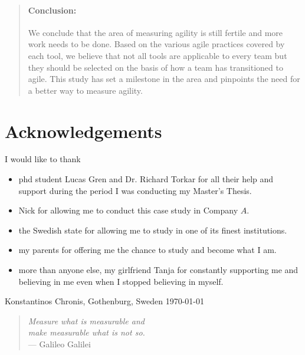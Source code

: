 \begin{abstract}
\paragraph{Conclusion:} 
We conclude that the area of measuring agility is still fertile and more work needs to be done. Based on the various agile practices covered by each tool, we believe that not all tools are applicable to every team but they should be selected on the basis of how a team has transitioned to agile. This study has set a milestone in the area and pinpoints the need for a better way to measure agility. 

\end{abstract}

\newpage
\clearpage
\mbox{}
\newpage
\clearpage
\thispagestyle{empty}
\section*{Acknowledgements}

I would like to thank
\begin{itemize}
	\item[] phd student Lucas Gren and Dr. Richard Torkar for all their help and support during the period I was conducting my Master's Thesis.
	\item[] Nick for allowing me to conduct this case study in Company $A$.
	\item[] the Swedish state for allowing me to study in one of its finest institutions.
	\item[] my parents for offering me the chance to study and become what I am. 
	\item[] more than anyone else, my girlfriend Tanja for constantly supporting me and believing in me even when I stopped believing in myself. \\[1cm]
\end{itemize}

\hfill Konstantinos Chronis, Gothenburg, Sweden \today

\newpage
\clearpage
\vspace*{\fill} 
\begin{quote} 
\centering 
{\Large \textit{Measure what is measurable and}} \\ 
{\Large \textit{make measurable what is not so.}} \\ 
\hspace{7cm} --- Galileo Galilei
\end{quote}
\vspace*{\fill}
\mbox{}

\newpage
\clearpage
\mbox{}
